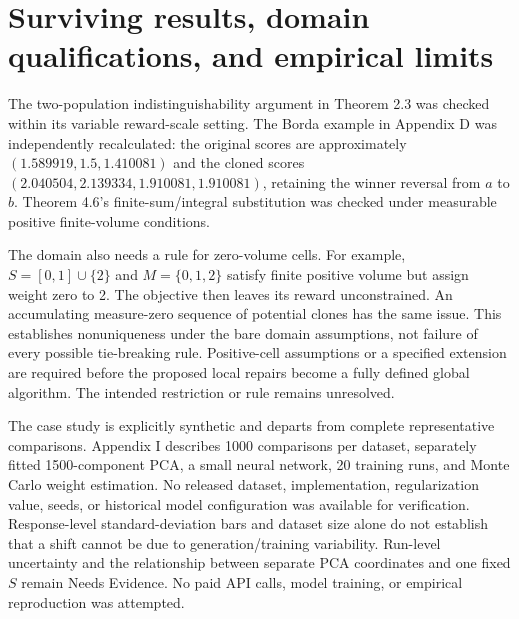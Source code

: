 \documentclass[10pt]{article}
\begin{document}
\section*{Surviving results, domain qualifications, and empirical limits}
The two-population indistinguishability argument in Theorem 2.3 was checked within its variable reward-scale setting. The Borda example in Appendix D was independently recalculated: the original scores are approximately \((1.589919,1.5,1.410081)\) and the cloned scores \((2.040504,2.139334,1.910081,1.910081)\), retaining the winner reversal from \(a\) to \(b\). Theorem 4.6’s finite-sum/integral substitution was checked under measurable positive finite-volume conditions.\par
The domain also needs a rule for zero-volume cells. For example, \(S=[0,1]\cup\{2\}\) and \(M=\{0,1,2\}\) satisfy finite positive volume but assign weight zero to 2. The objective then leaves its reward unconstrained. An accumulating measure-zero sequence of potential clones has the same issue. This establishes nonuniqueness under the bare domain assumptions, not failure of every possible tie-breaking rule. Positive-cell assumptions or a specified extension are required before the proposed local repairs become a fully defined global algorithm. The intended restriction or rule remains unresolved.\par
The case study is explicitly synthetic and departs from complete representative comparisons. Appendix I describes 1000 comparisons per dataset, separately fitted 1500-component PCA, a small neural network, 20 training runs, and Monte Carlo weight estimation. No released dataset, implementation, regularization value, seeds, or historical model configuration was available for verification. Response-level standard-deviation bars and dataset size alone do not establish that a shift cannot be due to generation/training variability. Run-level uncertainty and the relationship between separate PCA coordinates and one fixed \(S\) remain Needs Evidence. No paid API calls, model training, or empirical reproduction was attempted.\par
\end{document}
